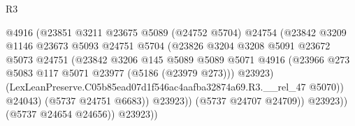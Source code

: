\begin{lexlean}{R3}
\begin{coremodule}
                                            @4916
                                            (@23851
                                              @3211
                                              @23675
                                              @5089
                                              (@24752 @5704)
                                              @24754
                                              (@23842
                                                @3209
                                                @1146
                                                @23673
                                                @5093
                                                @24751
                                                @5704
                                                (@23826
                                                  @3204
                                                  @3208
                                                  @5091
                                                  @23672
                                                  @5073
                                                  @24751
                                                  (@23842
                                                    @3206
                                                    @145
                                                    @5089
                                                    @5089
                                                    @5071
                                                    @4916
                                                    (@23966
                                                      @273
                                                      @5083
                                                      @117
                                                      @5071
                                                      @23977
                                                      (@5186 (@23979 @273)))
                                                    @23923)
                                                  (LexLeanPreserve.C05b85ead07d1f546ac4aafba32874a69.R3.__rel_47
                                                    @5070))
                                                @24043)
                                              (@5737 @24751 @6683))
                                            @23923))
                                        (@5737 @24707 @24709))
                                      @23923))
                                  (@5737 @24654 @24656))
                                @23923))

\end{coremodule}
\end{lexlean}
